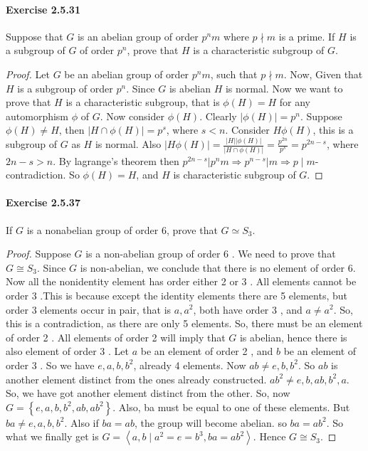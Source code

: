 \documentclass{article}
\begin{document}
\paragraph{Exercise 2.5.31} Suppose that $G$ is an abelian group of order $p^nm$ where $p \nmid m$ is a prime.  If $H$ is a subgroup of $G$ of order $p^n$, prove that $H$ is a characteristic subgroup of $G$.
\begin{proof}
    Let $G$ be an abelian group of order $p^n m$, such that $p \nmid m$. Now, Given that $H$ is a subgroup of order $p^n$. Since $G$ is abelian $H$ is normal. Now we want to prove that $H$ is a characteristic subgroup, that is $\phi(H)=H$ for any automorphism $\phi$ of $G$. Now consider $\phi(H)$. Clearly $|\phi(H)|=p^n$. Suppose $\phi(H) \neq H$, then $|H \cap \phi(H)|=p^s$, where $s<n$. Consider $H \phi(H)$, this is a subgroup of $G$ as $H$ is normal. Also $|H \phi(H)|=\frac{|H||\phi(H)|}{|H \cap \phi(H)|}=\frac{p^{2 n}}{p^s}=p^{2 n-s}$, where $2 n-s>n$. By lagrange's theorem then $p^{2 n-s}\left|p^n m \Longrightarrow p^{n-s}\right| m \Longrightarrow p \mid m$-contradiction. So $\phi(H)=H$, and $H$ is characteristic subgroup of $G$.
\end{proof}



\paragraph{Exercise 2.5.37} If $G$ is a nonabelian group of order 6, prove that $G \simeq S_3$.
\begin{proof}
    Suppose $G$ is a non-abelian group of order 6 . We need to prove that $G \cong S_3$. Since $G$ is non-abelian, we conclude that there is no element of order 6. Now all the nonidentity element has order either 2 or 3 . All elements cannot be order 3 .This is because except the identity elements there are 5 elements, but order 3 elements occur in pair, that is $a, a^2$, both have order 3 , and $a \neq a^2$. So, this is a contradiction, as there are only 5 elements. So, there must be an element of order 2 . All elements of order 2 will imply that $G$ is abelian, hence there is also element of order 3 . Let $a$ be an element of order 2 , and $b$ be an element of order 3 . So we have $e, a, b, b^2$, already 4 elements. Now $a b \neq e, b, b^2$. So $a b$ is another element distinct from the ones already constructed. $a b^2 \neq e, b, a b, b^2, a$. So, we have got another element distinct from the other. So, now $ G=\left\{e, a, b, b^2, a b, a b^2\right\}$. Also, ba must be equal to one of these elements. But $b a \neq e, a, b, b^2$. Also if $b a=a b$, the group will become abelian. so $b a=a b^2$. So what we finally get is $G=\left\langle a, b \mid a^2=e=b^3, b a=a b^2\right\rangle$. Hence $G \cong S_3$.
\end{proof}
\end{document}
